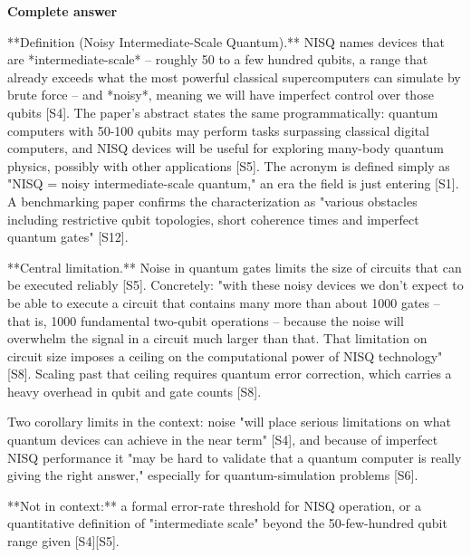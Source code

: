 \documentclass[10pt]{article}
\begin{document}
\textbf{Complete answer}
\begin{AnswerText}
**Definition (Noisy Intermediate-Scale Quantum).** NISQ names devices that are *intermediate-scale* -- roughly 50 to a few hundred qubits, a range that already exceeds what the most powerful classical supercomputers can simulate by brute force -- and *noisy*, meaning we will have imperfect control over those qubits [S4]. The paper's abstract states the same programmatically: quantum computers with 50-100 qubits may perform tasks surpassing classical digital computers, and NISQ devices will be useful for exploring many-body quantum physics, possibly with other applications [S5]. The acronym is defined simply as "NISQ = noisy intermediate-scale quantum," an era the field is just entering [S1]. A benchmarking paper confirms the characterization as "various obstacles including restrictive qubit topologies, short coherence times and imperfect quantum gates" [S12].

**Central limitation.** Noise in quantum gates limits the size of circuits that can be executed reliably [S5]. Concretely: "with these noisy devices we don't expect to be able to execute a circuit that contains many more than about 1000 gates -- that is, 1000 fundamental two-qubit operations -- because the noise will overwhelm the signal in a circuit much larger than that. That limitation on circuit size imposes a ceiling on the computational power of NISQ technology" [S8]. Scaling past that ceiling requires quantum error correction, which carries a heavy overhead in qubit and gate counts [S8].

Two corollary limits in the context: noise "will place serious limitations on what quantum devices can achieve in the near term" [S4], and because of imperfect NISQ performance it "may be hard to validate that a quantum computer is really giving the right answer," especially for quantum-simulation problems [S6].

**Not in context:** a formal error-rate threshold for NISQ operation, or a quantitative definition of "intermediate scale" beyond the 50-few-hundred qubit range given [S4][S5].
\end{AnswerText}
\end{document}
